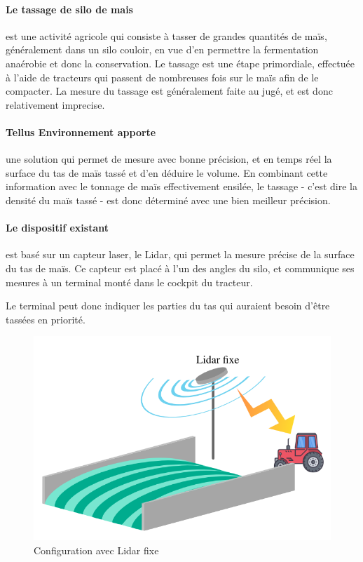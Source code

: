 \documentclass[12pt,a4paper]{report}
\begin{document}
\paragraph{Le tassage de silo de mais} est une activité agricole qui consiste à  tasser de grandes quantités de maïs, généralement dans un silo couloir, en vue d'en permettre la fermentation anaérobie et donc la conservation. Le tassage est une étape primordiale, effectuée à l'aide de tracteurs qui passent de nombreuses fois sur le maïs afin de le compacter. La mesure du tassage est généralement faite au jugé, et est donc relativement imprecise.

\paragraph{Tellus Environnement apporte} une solution qui permet de mesure avec bonne précision, et en temps réel la surface du tas de maïs tassé et d'en déduire le volume. En combinant cette information avec le tonnage de maïs effectivement ensilée, le tassage - c'est dire la densité du maïs tassé - est donc déterminé avec une bien meilleur précision.

\paragraph{Le dispositif existant} est basé sur un capteur laser, le Lidar, qui permet la mesure précise de la surface du tas de maïs. Ce capteur est placé à l'un des angles du silo, et communique ses mesures à un terminal monté dans le cockpit du tracteur.
\newline

Le terminal peut donc indiquer  les parties du tas qui auraient besoin d'être tassées en priorité.


\begin{figure}[H]
	\centering
	\includegraphics[width=0.7\linewidth]{img/LidarFixe}
	\caption[]{Configuration avec Lidar fixe}
	\label{fig:lidarfixe}
\end{figure}
\end{document}

